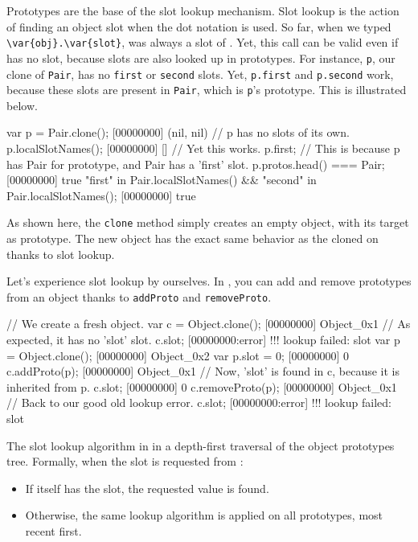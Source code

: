Prototypes are the base of the slot lookup mechanism. Slot lookup is the
action of finding an object slot when the dot notation is used.  So far,
when we typed \lstinline|\var{obj}.\var{slot}|,  was always a slot
of .  Yet, this call can be valid even if  has no
 slot, because slots are also looked up in prototypes. For
instance, \lstinline|p|, our clone of \lstinline|Pair|, has no
\lstinline|first| or \lstinline|second| slots. Yet, \lstinline|p.first| and
\lstinline|p.second| work, because these slots are present in
\lstinline|Pair|, which is \lstinline|p|'s prototype. This is illustrated
below.

\begin{urbiscript}[firstnumber=1]
var p = Pair.clone();
[00000000] (nil, nil)
// p has no slots of its own.
p.localSlotNames();
[00000000] []
// Yet this works.
p.first;
// This is because p has Pair for prototype, and Pair has a 'first' slot.
p.protos.head() === Pair;
[00000000] true
"first" in Pair.localSlotNames() && "second" in Pair.localSlotNames();
[00000000] true
\end{urbiscript}

As shown here, the \lstinline{clone} method simply creates an empty object,
with its target as prototype. The new object has the exact same behavior as
the cloned on thanks to slot lookup.

Let's experience slot lookup by ourselves. In \us, you can add and remove
prototypes from an object thanks to \lstinline{addProto} and
\lstinline{removeProto}.

\begin{urbiscript}[firstnumber=1]
// We create a fresh object.
var c = Object.clone();
[00000000] Object_0x1
// As expected, it has no 'slot' slot.
c.slot;
[00000000:error] !!! lookup failed: slot
var p = Object.clone();
[00000000] Object_0x2
var p.slot = 0;
[00000000] 0
c.addProto(p);
[00000000] Object_0x1
// Now, 'slot' is found in c, because it is inherited from p.
c.slot;
[00000000] 0
c.removeProto(p);
[00000000] Object_0x1
// Back to our good old lookup error.
c.slot;
[00000000:error] !!! lookup failed: slot
\end{urbiscript}

The slot lookup algorithm in \us in a depth-first traversal of the object
prototypes tree. Formally, when the  slot is requested from :

\begin{itemize}
\item If  itself has the slot, the requested value is found.
\item Otherwise, the same lookup algorithm is applied on all prototypes,
  most recent first.
\end{itemize}

